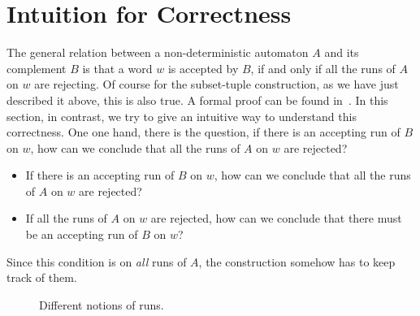 \section{Intuition for Correctness}
The general relation between a non-deterministic automaton $A$ and its complement $B$ is that a word $w$ is accepted by $B$, if and only if all the runs of $A$ on $w$ are rejecting. Of course for the subset-tuple construction, as we have just described it above, this is also true. A formal proof can be found in~\cite{2014_joel_ulrich}. In this section, in contrast, we try to give an intuitive way to understand this correctness. One one hand, there is the question, if there is an accepting run of $B$ on $w$, how can we conclude that all the runs of $A$ on $w$ are rejected?

\begin{itemize}
\item If there is an accepting run of $B$ on $w$, how can we conclude that all the runs of $A$ on $w$ are rejected?
\item If all the runs of $A$ on $w$ are rejected, how can we conclude that there must be an accepting run of $B$ on $w$?
\end{itemize}


Since this condition is on \emph{all} runs of $A$, the construction somehow has to keep track of them. 
\label{lower_part:intuition}
\begin{figure}
\begin{center}
\RunTypes
\caption{Different notions of runs.}
\label{run_types}
\end{center}
\end{figure}


